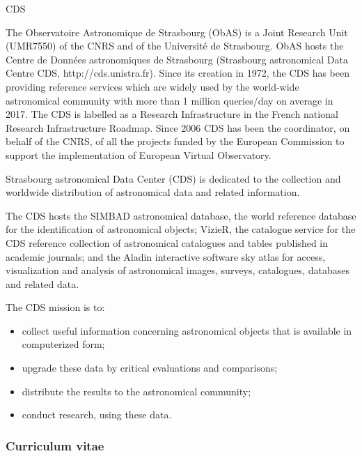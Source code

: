 \begin{sitedescription}{CDS}

The Observatoire Astronomique de Strasbourg (ObAS) is a Joint Research Unit
(UMR7550) of the CNRS and of the Université de Strasbourg. ObAS hosts the 
Centre de Données astronomiques de Strasbourg (Strasbourg astronomical Data 
Centre CDS, http://cds.unistra.fr). Since its creation in 1972, the CDS has 
been providing reference services which are widely used by the world-wide 
astronomical community with more than 1 million queries/day on average in 
2017. The CDS is labelled as a Research Infrastructure in the French national
Research Infrastructure Roadmap. Since 2006 CDS has been the coordinator,
on behalf of the CNRS, of all the projects funded by the European Commission
to support the implementation of European Virtual Observatory. 

Strasbourg astronomical Data Center (CDS) is dedicated to the collection and
worldwide distribution of astronomical data and related information.

The CDS hosts the SIMBAD astronomical database, the world reference database for the identification of astronomical objects; VizieR, the catalogue service for the CDS reference collection of astronomical catalogues and tables published in academic journals; and the Aladin interactive software sky atlas for access, visualization and analysis of astronomical images, surveys, catalogues, databases and related data.

The CDS mission is to:

\begin{itemize}
  \item collect useful information concerning astronomical objects that is available in computerized form;
  \item upgrade these data by critical evaluations and comparisons;
  \item distribute the results to the astronomical community;
  \item conduct research, using these data.
\end{itemize}

%

\subsubsection*{Curriculum vitae}


\end{sitedescription}
